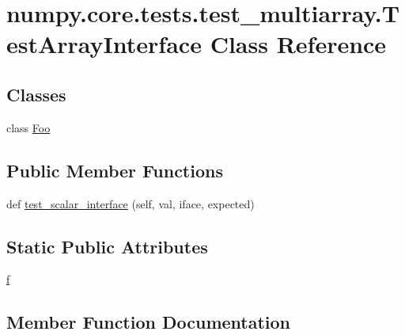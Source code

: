\hypertarget{classnumpy_1_1core_1_1tests_1_1test__multiarray_1_1TestArrayInterface}{}\section{numpy.\+core.\+tests.\+test\+\_\+multiarray.\+Test\+Array\+Interface Class Reference}
\label{classnumpy_1_1core_1_1tests_1_1test__multiarray_1_1TestArrayInterface}
\subsection*{Classes}
\begin{DoxyCompactItemize}
\item 
class \hyperlink{classnumpy_1_1core_1_1tests_1_1test__multiarray_1_1TestArrayInterface_1_1Foo}{Foo}
\end{DoxyCompactItemize}
\subsection*{Public Member Functions}
\begin{DoxyCompactItemize}
\item 
def \hyperlink{classnumpy_1_1core_1_1tests_1_1test__multiarray_1_1TestArrayInterface_a9cf04b986b53762bdd41b8abcd23c6b4}{test\+\_\+scalar\+\_\+interface} (self, val, iface, expected)
\end{DoxyCompactItemize}
\subsection*{Static Public Attributes}
\begin{DoxyCompactItemize}
\item 
\hyperlink{classnumpy_1_1core_1_1tests_1_1test__multiarray_1_1TestArrayInterface_aa7fd02f8544c84257c11419d3cccaa1c}{f}
\end{DoxyCompactItemize}


\subsection{Member Function Documentation}
\mbox{\label{classnumpy_1_1core_1_1tests_1_1test__multiarray_1_1TestArrayInterface_a9cf04b986b53762bdd41b8abcd23c6b4}} 
